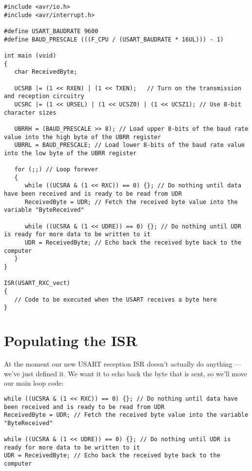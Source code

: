 \documentclass[a4paper,oneside]{book}
\begin{document}
\begin{center}
\begin{lstlisting}
#include <avr/io.h>
#include <avr/interrupt.h>

#define USART_BAUDRATE 9600
#define BAUD_PRESCALE (((F_CPU / (USART_BAUDRATE * 16UL))) - 1)

int main (void)
{
   char ReceivedByte;

   UCSRB |= (1 << RXEN) | (1 << TXEN);   // Turn on the transmission and reception circuitry
   UCSRC |= (1 << URSEL) | (1 << UCSZ0) | (1 << UCSZ1); // Use 8-bit character sizes

   UBRRH = (BAUD_PRESCALE >> 8); // Load upper 8-bits of the baud rate value into the high byte of the UBRR register
   UBRRL = BAUD_PRESCALE; // Load lower 8-bits of the baud rate value into the low byte of the UBRR register

   for (;;) // Loop forever
   {
      while ((UCSRA & (1 << RXC)) == 0) {}; // Do nothing until data have been received and is ready to be read from UDR
      ReceivedByte = UDR; // Fetch the received byte value into the variable "ByteReceived"

      while ((UCSRA & (1 << UDRE)) == 0) {}; // Do nothing until UDR is ready for more data to be written to it
      UDR = ReceivedByte; // Echo back the received byte back to the computer
   }   
}

ISR(USART_RXC_vect)
{
   // Code to be executed when the USART receives a byte here
}
\end{lstlisting}
\end{center}


\chapter{Populating the ISR}

At the moment our new USART reception ISR doesn't actually do anything --- we've just defined it. We want it to echo back the byte that is sent, so we'll move our main loop code:

\begin{center}
\begin{lstlisting}
while ((UCSRA & (1 << RXC)) == 0) {}; // Do nothing until data have been received and is ready to be read from UDR
ReceivedByte = UDR; // Fetch the received byte value into the variable "ByteReceived"

while ((UCSRA & (1 << UDRE)) == 0) {}; // Do nothing until UDR is ready for more data to be written to it
UDR = ReceivedByte; // Echo back the received byte back to the computer
\end{lstlisting}
\end{center}
\end{document}
